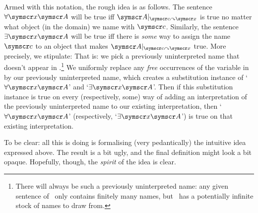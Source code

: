 Armed with this notation, the rough idea is as follows. The sentence $\forall \meta{x}\meta{A}$ will be true iff $\meta{A}\subs{\meta{c}}{\meta{x}}$ is true no matter what object (in the domain) we name with $\meta{c}$. Similarly, the sentence $\exists \meta{x}\meta{A}$ will be true iff there is \emph{some} way to assign the name $\meta{c}$ to an object that makes $\meta{A}\subs{\meta{c}}{\meta{x}}$ true. More precisely, we stipulate:\label{quant.tcs.precise}
That is: we pick a previously uninterpreted name that doesn't appear in .\footnote{There will always be such a previously uninterpreted name: any given sentence of \FOL\ only contains finitely many names, but \FOL\ has a potentially infinite stock of names to draw from.} We uniformly replace any \emph{free} occurrences of the variable  in  by our previously uninterpreted name, which creates a substitution instance of `$\forall \meta{x}\meta{A}$' and `$\exists \meta{x}\meta{A}$'. Then if this substitution instance is true on every (respectively, some) way of adding an interpretation of the previously uninterpreted name to our existing interpretation, then `$\forall \meta{x}\meta{A}$' (respectively, `$\exists \meta{x}\meta{A}$') is true on that existing interpretation. 

To be clear: all this is doing is formalising (very pedantically) the intuitive idea expressed above. The result is a bit ugly, and the final definition might look a bit opaque. Hopefully, though, the \emph{spirit} of the idea is clear. 

